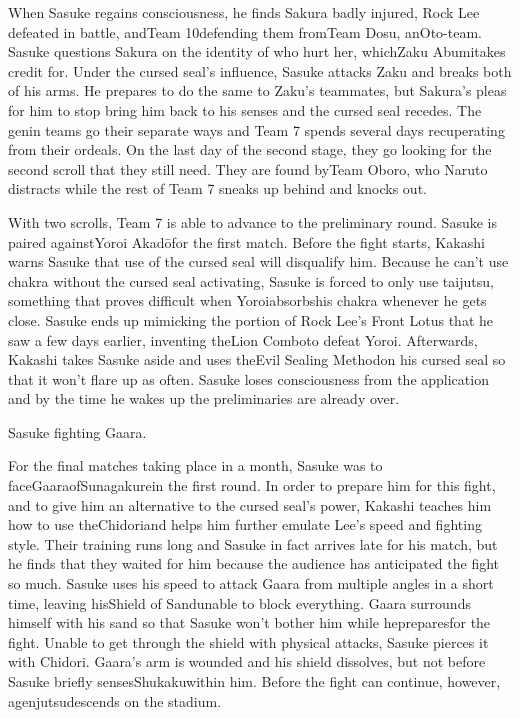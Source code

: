 \documentclass[a4paper,12pt]{article}
\begin{document}
When Sasuke regains consciousness, he finds Sakura badly injured, Rock Lee defeated in battle, andTeam 10defending them fromTeam Dosu, anOto-team. Sasuke questions Sakura on the identity of who hurt her, whichZaku Abumitakes credit for. Under the cursed seal's influence, Sasuke attacks Zaku and breaks both of his arms. He prepares to do the same to Zaku's teammates, but Sakura's pleas for him to stop bring him back to his senses and the cursed seal recedes. The genin teams go their separate ways and Team 7 spends several days recuperating from their ordeals. On the last day of the second stage, they go looking for the second scroll that they still need. They are found byTeam Oboro, who Naruto distracts while the rest of Team 7 sneaks up behind and knocks out.\\ \par \vspace{0.5cm}

With two scrolls, Team 7 is able to advance to the preliminary round. Sasuke is paired againstYoroi Akadōfor the first match. Before the fight starts, Kakashi warns Sasuke that use of the cursed seal will disqualify him. Because he can't use chakra without the cursed seal activating, Sasuke is forced to only use taijutsu, something that proves difficult when Yoroiabsorbshis chakra whenever he gets close. Sasuke ends up mimicking the portion of Rock Lee's Front Lotus that he saw a few days earlier, inventing theLion Comboto defeat Yoroi. Afterwards, Kakashi takes Sasuke aside and uses theEvil Sealing Methodon his cursed seal so that it won't flare up as often. Sasuke loses consciousness from the application and by the time he wakes up the preliminaries are already over.\\ \par \vspace{0.5cm}

Sasuke fighting Gaara.\\ \par \vspace{0.5cm}

For the final matches taking place in a month, Sasuke was to faceGaaraofSunagakurein the first round. In order to prepare him for this fight, and to give him an alternative to the cursed seal's power, Kakashi teaches him how to use theChidoriand helps him further emulate Lee's speed and fighting style. Their training runs long and Sasuke in fact arrives late for his match, but he finds that they waited for him because the audience has anticipated the fight so much. Sasuke uses his speed to attack Gaara from multiple angles in a short time, leaving hisShield of Sandunable to block everything. Gaara surrounds himself with his sand so that Sasuke won't bother him while hepreparesfor the fight. Unable to get through the shield with physical attacks, Sasuke pierces it with Chidori. Gaara's arm is wounded and his shield dissolves, but not before Sasuke briefly sensesShukakuwithin him. Before the fight can continue, however, agenjutsudescends on the stadium.\\ \par \vspace{0.5cm}
\end{document}
